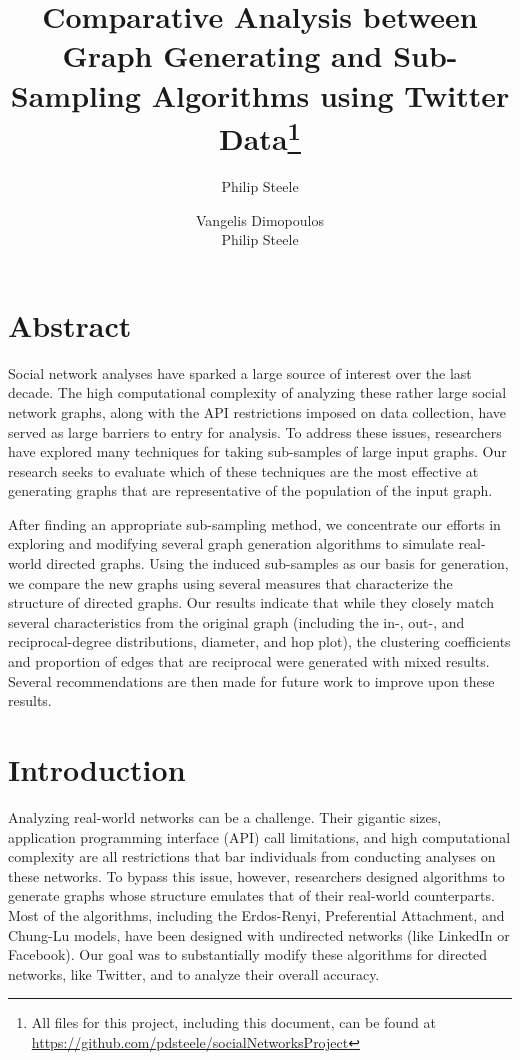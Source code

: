 \documentclass[pdftex,11pt,a4paper,twocolumn]{scrartcl}
\author{Philip Steele}
\author{Vangelis Dimopoulos \\ Philip Steele}
\title{Comparative Analysis between Graph Generating and Sub-Sampling Algorithms using Twitter Data\footnote{All files for this project, including this document, can be found at \url{https://github.com/pdsteele/socialNetworksProject}}}
\date{}
\begin{document}
\onecolumn
\maketitle
  
\singlespacing

\section*{Abstract}

Social network analyses have sparked a large source of interest over the last decade. The high computational complexity of analyzing these rather large social network graphs, along with the API restrictions imposed on data collection, have served as large barriers to entry for analysis. To address these issues, researchers have explored many techniques for taking sub-samples of large input graphs. Our research seeks to evaluate which of these techniques are the most effective at generating graphs that are representative of the population of the input graph.

After finding an appropriate sub-sampling method, we concentrate our efforts in exploring and modifying several graph generation algorithms to simulate real-world directed graphs. Using the induced sub-samples as our basis for generation, we compare the new graphs using several measures that characterize the structure of directed graphs. Our results indicate that while they closely match several characteristics from the original graph (including the in-, out-, and reciprocal-degree distributions, diameter, and hop plot), the clustering coefficients and proportion of edges that are reciprocal were generated with mixed results. Several recommendations are then made for future work to improve upon these results. 

\newpage

\tableofcontents

\newpage

\twocolumn
\section{Introduction}

Analyzing real-world networks can be a challenge. Their gigantic sizes, application programming interface (API) call limitations, and high computational complexity are all restrictions that bar individuals from conducting analyses on these networks. To bypass this issue, however, researchers designed algorithms to generate graphs whose structure emulates that of their real-world counterparts. Most of the algorithms, including the Erdos-Renyi, Preferential Attachment, and Chung-Lu models, have been designed with undirected networks (like LinkedIn or Facebook). Our goal was to substantially modify these algorithms for directed networks, like Twitter, and to analyze their overall accuracy.
\end{document}
